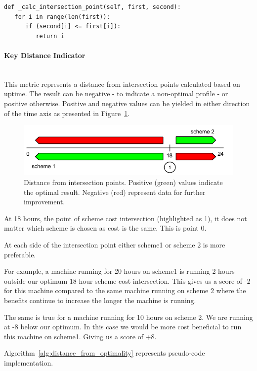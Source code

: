 \documentclass[]{final_report}
\newcommand{\myparagraph}[1]{\paragraph{#1}\mbox{}\\}
\begin{document}
\begin{minipage}{\linewidth}
\begin{lstlisting}[label={intersection_points},caption={Intersection point between various pricing schemes},frame=single] 
def _calc_intersection_point(self, first, second):
   for i in range(len(first)):
      if (second[i] <= first[i]):
         return i
\end{lstlisting}
\end{minipage}

\myparagraph{Key Distance Indicator}

This metric represents a distance from intersection points calculated based on uptime. The result can be negative - to indicate a non-optimal profile - or positive otherwise. Positive and negative values can be yielded in either direction of the time axis as presented in Figure~\ref{fig:distance}. 

\begin{figure}[H]
       \includegraphics[width=\linewidth]{figures/distance}
      \caption{Distance from intersection points. Positive (green) values indicate the optimal result. Negative (red) represent data for further improvement.}
        \label{fig:distance}
\end{figure}

At 18 hours, the point of scheme cost intersection (highlighted as 1), it does not matter which scheme is chosen as cost is the same. This is point 0.

At each side of the intersection point either scheme1 or scheme 2 is more preferable.

For example, a machine running for 20 hours on scheme1 is running 2 hours outside our optimum 18 hour scheme cost intersection. This gives us a score of -2 for this machine compared to the same machine running on scheme 2 where the benefits continue to increase the longer the machine is running.

The same is true for a machine running for 10 hours on scheme 2. We are running at -8 below our optimum. In this case we would be more cost beneficial to run this machine on scheme1. Giving us a score of +8.

Algorithm~\ref{alg:distance_from_optimality} represents pseudo-code implementation.
\end{document}
